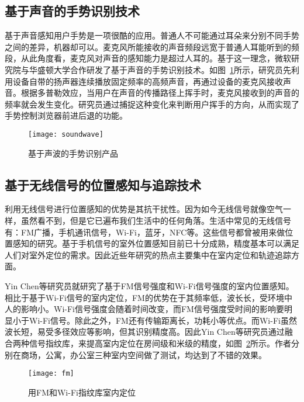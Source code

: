 \subsection{基于声音的手势识别技术}
基于声音感知用户手势是一项很酷的应用。普通人不可能通过耳朵来分别不同手势之间的差异，机器却可以。麦克风所能接收的声音频段远宽于普通人耳能听到的频段，从此角度看，麦克风对声音的感知能力是超过人耳的。基于这一理念，微软研究院与华盛顿大学合作研发了基于声音的手势识别技术。如图~\ref{fig:soundwave}所示，研究员先利用设备自带的扬声器连续播放固定频率的高频声音，再通过设备的麦克风接收声音。根据多普勒效应，当用户在声音的传播路径上挥手时，麦克风接收到的声音的频率就会发生变化。研究员通过捕捉这种变化来判断用户挥手的方向，从而实现了手势控制浏览器前进后退的功能。
\begin{figure}[htbp] %
  \centering
  \texttt{[image: soundwave]}
  \caption{基于声波的手势识别产品}
  \label{fig:soundwave}
\end{figure}

\subsection{基于无线信号的位置感知与追踪技术}
利用无线信号进行位置感知的优势是其抗干扰性。因为如今无线信号就像空气一样，虽然看不到，但是它已遍布我们生活中的任何角落。生活中常见的无线信号有：FM广播，手机通讯信号，Wi-Fi，蓝牙，NFC等。这些信号都曾被用来做位置感知的研究。基于手机信号的室外位置感知目前已十分成熟，精度基本可以满足人们对室外定位的需求。因此近些年研究的热点主要集中在室内定位和轨迹追踪方面。

Yin Chen等研究员就研究了基于FM信号强度和Wi-Fi信号强度的室内位置感知。相比于基于Wi-Fi信号的室内定位，FM的优势在于其频率低，波长长，受环境中人的影响小。Wi-Fi信号强度会随着时间改变，而FM信号强度受时间的影响要明显小于Wi-Fi信号。除此之外，FM还有传输距离长，功耗小等优点。而Wi-Fi虽然波长短，易受多径效应等影响，但其识别精度高。因此Yin Chen等研究员通过融合两种信号指纹库，来提高室内定位在房间级和米级的精度，如图~\ref{fig:fm}所示。作者分别在商场，公寓，办公室三种室内空间做了测试，均达到了不错的效果。

\begin{figure}[htbp] %
  \centering
  \texttt{[image: fm]}
  \caption{用FM和Wi-Fi指纹库室内定位}
  \label{fig:fm}
\end{figure}

